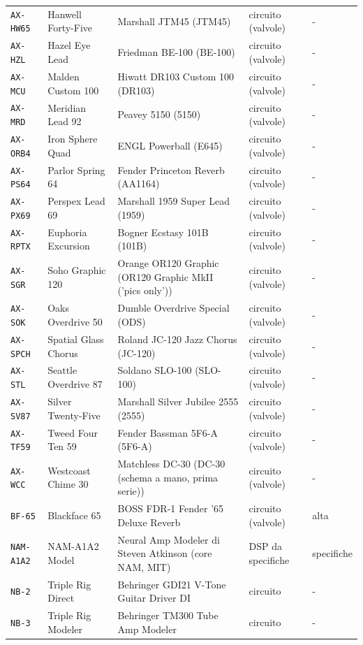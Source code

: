 \begin{xltabular}{\linewidth}{@{}l l X l l@{}}
\texttt{AX-HW65} & Hanwell Forty-Five & Marshall JTM45 (JTM45) & circuito (valvole) & -\\
\texttt{AX-HZL} & Hazel Eye Lead & Friedman BE-100 (BE-100) & circuito (valvole) & -\\
\texttt{AX-MCU} & Malden Custom 100 & Hiwatt DR103 Custom 100 (DR103) & circuito (valvole) & -\\
\texttt{AX-MRD} & Meridian Lead 92 & Peavey 5150 (5150) & circuito (valvole) & -\\
\texttt{AX-ORB4} & Iron Sphere Quad & ENGL Powerball (E645) & circuito (valvole) & -\\
\texttt{AX-PS64} & Parlor Spring 64 & Fender Princeton Reverb (AA1164) & circuito (valvole) & -\\
\texttt{AX-PX69} & Perspex Lead 69 & Marshall 1959 Super Lead (1959) & circuito (valvole) & -\\
\texttt{AX-RPTX} & Euphoria Excursion & Bogner Ecstasy 101B (101B) & circuito (valvole) & -\\
\texttt{AX-SGR} & Soho Graphic 120 & Orange OR120 Graphic (OR120 Graphic MkII ('pics only')) & circuito (valvole) & -\\
\texttt{AX-SOK} & Oaks Overdrive 50 & Dumble Overdrive Special (ODS) & circuito (valvole) & -\\
\texttt{AX-SPCH} & Spatial Glass Chorus & Roland JC-120 Jazz Chorus (JC-120) & circuito (valvole) & -\\
\texttt{AX-STL} & Seattle Overdrive 87 & Soldano SLO-100 (SLO-100) & circuito (valvole) & -\\
\texttt{AX-SV87} & Silver Twenty-Five & Marshall Silver Jubilee 2555 (2555) & circuito (valvole) & -\\
\texttt{AX-TF59} & Tweed Four Ten 59 & Fender Bassman 5F6-A (5F6-A) & circuito (valvole) & -\\
\texttt{AX-WCC} & Westcoast Chime 30 & Matchless DC-30 (DC-30 (schema a mano, prima serie)) & circuito (valvole) & -\\
\texttt{BF-65} & Blackface 65 & BOSS FDR-1 Fender '65 Deluxe Reverb & circuito (valvole) & alta\\
\texttt{NAM-A1A2} & NAM-A1A2 Model & Neural Amp Modeler di Steven Atkinson (core NAM, MIT) & DSP da specifiche & specifiche\\
\texttt{NB-2} & Triple Rig Direct & Behringer GDI21 V-Tone Guitar Driver DI & circuito & -\\
\texttt{NB-3} & Triple Rig Modeler & Behringer TM300 Tube Amp Modeler & circuito & -\\

\end{xltabular}
